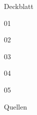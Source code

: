 \documentclass[11pt]{scrreprt}
\begin{document}
\setcounter{page}{1}   %

{Deckblatt}

\setcounter{chapter}{0} 
\tableofcontents %
\pagebreak

% 





{01}

{02}

{03}

{04}

{05}


{Quellen}

\newpage
% 
\end{document}
